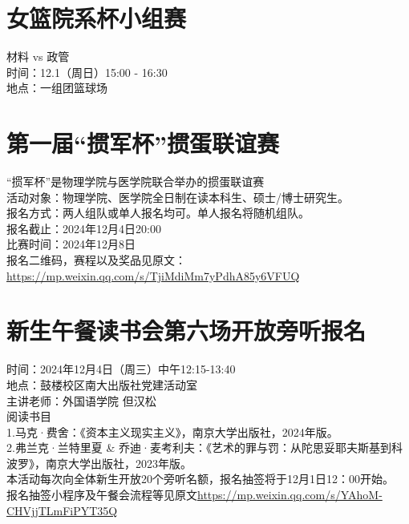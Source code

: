 \documentclass[letterpaper, 12pt]{article}
\begin{document}
\begin{multicols}{2}
\section{女篮院系杯小组赛}
材料 vs 政管 \\
时间：12.1（周日）15:00 - 16:30\\
地点：一组团篮球场\\

\section{第一届“掼军杯”掼蛋联谊赛}
“掼军杯”是物理学院与医学院联合举办的掼蛋联谊赛\\
活动对象：物理学院、医学院全日制在读本科生、硕士/博士研究生。\\
报名方式：两人组队或单人报名均可。单人报名将随机组队。\\
报名截止：2024年12月4日20:00\\
比赛时间：2024年12月8日\\
报名二维码，赛程以及奖品见原文：\url{https://mp.weixin.qq.com/s/TjiMdiMm7yPdhA85y6VFUQ}

\section{新生午餐读书会第六场开放旁听报名}
时间：2024年12月4日（周三）中午12:15-13:40\\
地点：鼓楼校区南大出版社党建活动室\\
主讲老师：外国语学院 但汉松\\
阅读书目\\
1.马克·费舍：《资本主义现实主义》，南京大学出版社，2024年版。 \\
2.弗兰克·兰特里夏 \& 乔迪·麦考利夫：《艺术的罪与罚：从陀思妥耶夫斯基到科波罗》，南京大学出版社，2023年版。\\
本活动每次向全体新生开放20个旁听名额，报名抽签将于12月1日12：00开始。\\
报名抽签小程序及午餐会流程等见原文\url{https://mp.weixin.qq.com/s/YAhoM-CHVjjTLmFiPYT35Q}\\

\end{multicols} 
\end{document}
